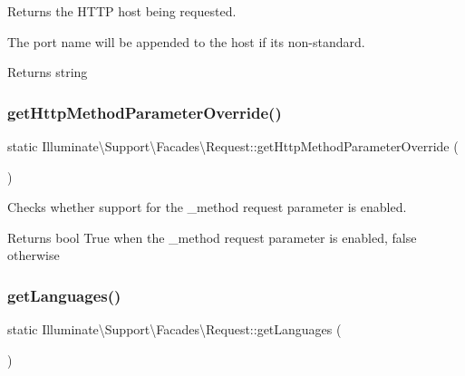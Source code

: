 Returns the H\+T\+TP host being requested.

The port name will be appended to the host if it\textquotesingle{}s non-\/standard.

\begin{DoxyReturn}{Returns}
string 
\end{DoxyReturn}
\mbox{\label{class_illuminate_1_1_support_1_1_facades_1_1_request_a6dc526d395a74c75de55eb597cbf66d5}} 
\subsubsection{\texorpdfstring{get\+Http\+Method\+Parameter\+Override()}{getHttpMethodParameterOverride()}}
{\footnotesize\ttfamily static Illuminate\textbackslash{}\+Support\textbackslash{}\+Facades\textbackslash{}\+Request\+::get\+Http\+Method\+Parameter\+Override (\begin{DoxyParamCaption}{ }\end{DoxyParamCaption})\hspace{0.3cm}{\ttfamily [static]}}

Checks whether support for the \+\_\+method request parameter is enabled.

\begin{DoxyReturn}{Returns}
bool True when the \+\_\+method request parameter is enabled, false otherwise 
\end{DoxyReturn}
\mbox{\label{class_illuminate_1_1_support_1_1_facades_1_1_request_a100339c165aa3a2ff6374907b8059aad}} 
\subsubsection{\texorpdfstring{get\+Languages()}{getLanguages()}}
{\footnotesize\ttfamily static Illuminate\textbackslash{}\+Support\textbackslash{}\+Facades\textbackslash{}\+Request\+::get\+Languages (\begin{DoxyParamCaption}{ }\end{DoxyParamCaption})\hspace{0.3cm}{\ttfamily [static]}}

